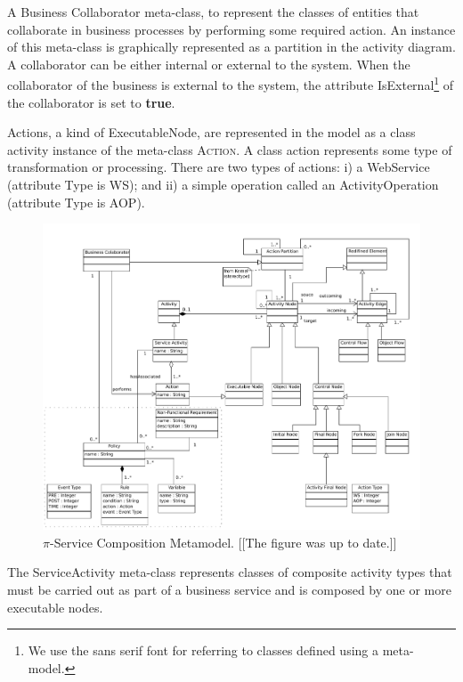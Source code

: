\begin{itemizedTrivlist}
\item A {\sc Business Collaborator} meta-class, to represent the classes of entities that collaborate in  business processes by performing some  required action. 
An instance of this meta-class is graphically represented as a partition in the activity diagram. 
A collaborator can be either internal or external to the system. 
When the collaborator of the business is external to the system, the attribute {\sf IsExternal}\footnote{We use the {\sf sans serif} font for referring to classes defined using a meta-model.} of the collaborator is set to \textbf{true}.

\item {\sc Action}s, a kind of {\sc ExecutableNode}, are represented in the model as a class activity instance of the meta-class \textsc{Action}. 
A class action represents some type of transformation or processing. 
There are two types of actions: i) a WebService (attribute Type is {\sf WS}); and ii) a simple operation called an {\sc ActivityOperation} (attribute Type is {\sc AOP}).

\begin{figure}[t]
\centering 
\includegraphics[width=1.0\textwidth]{figs/PiServiceComposition} 
\caption{$\pi$-Service Composition Metamodel. {\color{blue}[[The figure was up
to date.]]}}
\label{fig:e-scomposition-metamodel}
\end{figure}

\item The {\sc ServiceActivity} meta-class represents classes of composite activity types that must be carried out as part of a business service and is composed by one or more executable nodes.


\end{itemizedTrivlist}
